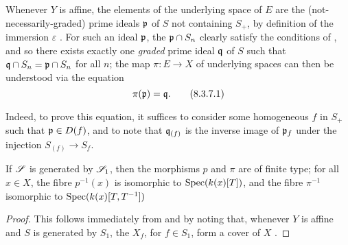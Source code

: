 \begin{remark}[8.3.7]
\label{2.8.3.7}
Whenever $Y$ is affine, the elements of the underlying space of $E$ are the (not-necessarily-graded) prime ideals $\mathfrak{p}$ of $S$ not containing $S_+$, by definition of the immersion $\varepsilon$ .
For such an ideal $\mathfrak{p}$, the $\mathfrak{p}\cap S_n$ clearly satisfy the conditions of , and so there exists exactly one \emph{graded} prime ideal $\mathfrak{q}$ of $S$ such that $\mathfrak{q}\cap S_n=\mathfrak{p}\cap S_n$ for all $n$;
the map $\pi:E\to X$ of underlying spaces can then be understood via the equation
\[
\label{eq:2.8.3.7.1}
  \pi(\mathfrak{p}) = \mathfrak{q}.
\tag{8.3.7.1}
\]

Indeed, to prove this equation, it suffices to consider some homogeneous $f$ in $S_+$ such that $\mathfrak{p}\in D(f)$, and to note that $\mathfrak{q}_{(f)}$ is the inverse image of $\mathfrak{p}_f$ under the injection $S_{(f)}\to S_f$.
\end{remark}

\begin{corollary}[8.3.8]
\label{2.8.3.8}
If $\mathscr{S}$ is generated by $\mathscr{S}_1$, then the morphisms $p$ and $\pi$ are of finite type;
for all $x\in X$, the fibre $p^{-1}(x)$ is isomorphic to $\operatorname{Spec}(k(x)[T])$, and the fibre $\pi^{-1}$ isomorphic to $\operatorname{Spec}(k(x)[T,T^{-1}])$
\end{corollary}

\begin{proof}
\label{proof-2.8.3.8}
This follows immediately from  and  by noting that, whenever $Y$ is affine and $S$ is generated by $S_1$, the $X_f$, for $f\in S_1$, form a cover of $X$ .
\end{proof}


